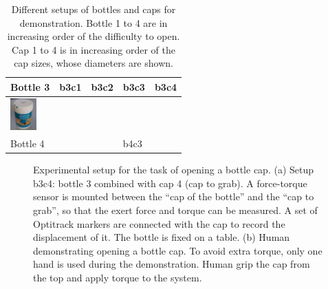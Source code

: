 \begin{table}
\begin{tabular}{p{1.5cm}|p{1cm} |p{1cm} |p{1cm} |p{1cm}}
Bottle 3 & b3c1& b3c2& b3c3& b3c4\\
\hline
\parbox[c]{1em}{ \includegraphics[width=1cm]{./fig/b4.jpg}} & & & &\\
Bottle 4 & & & b4c3&\\
\hline
\end{tabular}
\caption{Different setups of bottles and caps for demonstration. Bottle 1 to 4 are in increasing order of the difficulty to open. Cap 1 to 4 is in increasing order of the cap sizes, whose diameters are shown.}
\label{bottlesandcaps}
\end{table}

\begin{figure}
  \centering
  \hspace{1cm}
  \caption{ \scriptsize{Experimental setup for the task of opening a bottle cap. (a) Setup b3c4: bottle 3 combined with cap 4 (cap to grab). A force-torque sensor is mounted between the ``cap of the bottle'' and the ``cap to grab'', so that the exert force and torque can be measured. A set of Optitrack markers are connected with the cap to record the displacement of it. The bottle is fixed on a table. (b) Human demonstrating opening a bottle cap. To avoid extra torque, only one hand is used during the demonstration. Human grip the cap from the top and apply torque to the system. }
}
\label{fig:setup}
\end{figure}

